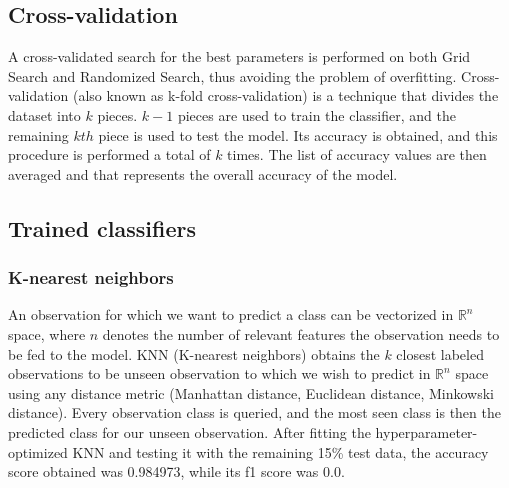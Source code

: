 \documentclass{article}
\begin{document}
	\subsection{Cross-validation}
		A cross-validated search for the best parameters is performed on both Grid Search and Randomized Search, thus avoiding the problem of overfitting. Cross-validation (also known as k-fold cross-validation) is a technique that divides the dataset into $k$ pieces. $k - 1$ pieces are used to train the classifier, and the remaining $kth$ piece is used to test the model. Its accuracy is obtained, and this procedure is performed a total of $k$ times. The list of accuracy values are then averaged and that represents the overall accuracy of the model.
	\subsection{Trained classifiers}
		\subsubsection{K-nearest neighbors}
			An observation for which we want to predict a class can be vectorized in $\mathbb{R}^{n}$ space, where $n$ denotes the number of relevant features the observation needs to be fed to the model. KNN (K-nearest neighbors) obtains the $k$ closest labeled observations to be unseen observation to which we wish to predict in $\mathbb{R}^{n}$ space using any distance metric (Manhattan distance, Euclidean distance, Minkowski distance). Every observation class is queried, and the most seen class is then the predicted class for our unseen observation. After fitting the hyperparameter-optimized KNN and testing it with the remaining 15\% test data, the accuracy score obtained was 0.984973, while its f1 score was 0.0.
\end{document}
